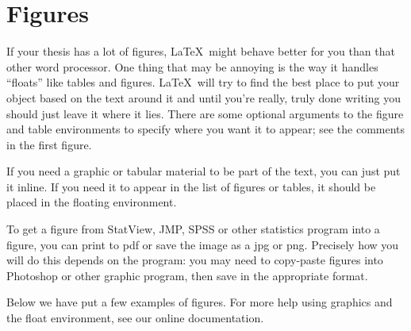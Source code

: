 \documentclass[12pt,twoside]{reedthesis}
\begin{document}
%
%
%   

   \section{Figures}
   
	If your thesis has a lot of figures, \LaTeX\ might behave better for you than that other word processor.  One thing that may be annoying is the way it handles ``floats'' like tables and figures. \LaTeX\ will try to find the best place to put your object based on the text around it and until you're really, truly done writing you should just leave it where it lies.   There are some optional arguments to the figure and table environments to specify where you want it to appear; see the comments in the first figure.

	If you need a graphic or tabular material to be part of the text, you can just put it inline. If you need it to appear in the list of figures or tables, it should be placed in the floating environment. 
	
	To get a figure from StatView, JMP, SPSS or other statistics program into a figure, you can print to pdf or save the image as a jpg or png. Precisely how you will do this depends on the program: you may need to copy-paste figures into Photoshop or other graphic program, then save in the appropriate format.
	
	Below we have put a few examples of figures. For more help using graphics and the float environment, see our online documentation.
	
\end{document}
